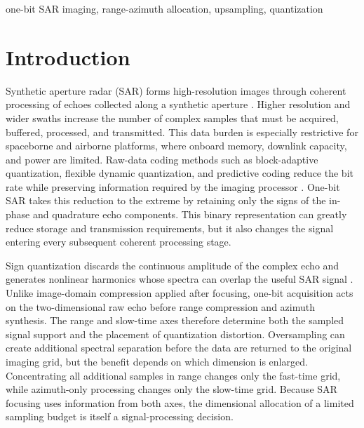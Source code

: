 \documentclass[conference]{IEEEtran}
\begin{document}
\begin{IEEEkeywords}
one-bit SAR imaging, range-azimuth allocation, upsampling, quantization
\end{IEEEkeywords}

\section{Introduction}

Synthetic aperture radar (SAR) forms high-resolution images through coherent processing of echoes collected along a synthetic aperture \cite{cumming2005sar,curlander1991sar}. Higher resolution and wider swaths increase the number of complex samples that must be acquired, buffered, processed, and transmitted. This data burden is especially restrictive for spaceborne and airborne platforms, where onboard memory, downlink capacity, and power are limited. Raw-data coding methods such as block-adaptive quantization, flexible dynamic quantization, and predictive coding reduce the bit rate while preserving information required by the imaging processor \cite{kwok1989baq,attema2010fdbaq,magli2003lossy}. One-bit SAR takes this reduction to the extreme by retaining only the signs of the in-phase and quadrature echo components. This binary representation can greatly reduce storage and transmission requirements, but it also changes the signal entering every subsequent coherent processing stage.

Sign quantization discards the continuous amplitude of the complex echo and generates nonlinear harmonics whose spectra can overlap the useful SAR signal \cite{franceschetti1999phase,zhao2019onebit}. Unlike image-domain compression applied after focusing, one-bit acquisition acts on the two-dimensional raw echo before range compression and azimuth synthesis. The range and slow-time axes therefore determine both the sampled signal support and the placement of quantization distortion. Oversampling can create additional spectral separation before the data are returned to the original imaging grid, but the benefit depends on which dimension is enlarged. Concentrating all additional samples in range changes only the fast-time grid, while azimuth-only processing changes only the slow-time grid. Because SAR focusing uses information from both axes, the dimensional allocation of a limited sampling budget is itself a signal-processing decision.
\end{document}
